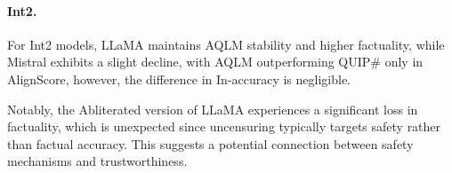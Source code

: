 \paragraph{Int2.}
For Int2 models, LLaMA maintains AQLM stability and higher factuality, while Mistral exhibits a slight decline, with AQLM outperforming QUIP\# only in AlignScore, however, the difference in In-accuracy is negligible.

Notably, the Abliterated version of LLaMA experiences a significant loss in factuality, which is unexpected since uncensuring typically targets safety rather than factual accuracy. This suggests a potential connection between safety mechanisms and trustworthiness.







  
  
	
